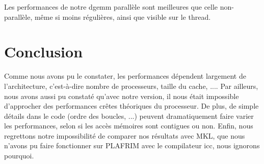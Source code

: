 \documentclass[a4paper,11pt]{article}
\begin{document}
Les performances de notre dgemm parallèle sont meilleures que celle non-parallèle, même si moins régulières, ainsi que visible sur le thread.
\section{Conclusion}

Comme nous avons pu le constater, les performances dépendent largement de l'architecture, c'est-à-dire nombre de processeurs, taille du cache, .... 
Par ailleurs, nous avons aussi pu constaté qu'avec notre version, il nous était impossible d'approcher des performances crêtes théoriques du processeur. 
De plus, de simple détails dans le code (ordre des boucles, ...) peuvent dramatiquement faire varier les performances, selon si les accès mémoires sont contigues ou non.
Enfin, nous regrettons notre impossibilité de comparer nos résultats avec MKL, que nous n'avons pu faire fonctionner sur PLAFRIM avec le compilateur icc, nous ignorons pourquoi.
\end{document}
